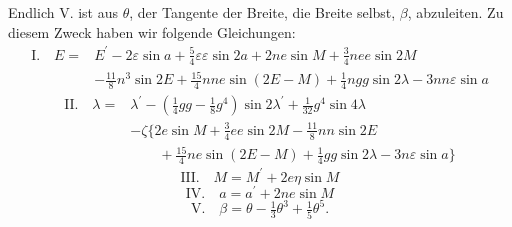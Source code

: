 \par\noindent\hspace*{\parindent}Endlich V. ist aus \(\theta\), der Tangente der Breite, die Breite selbst, \(\beta\),
abzuleiten. Zu diesem Zweck haben wir folgende Gleichungen:
\[
\begin{aligned}
\text{I.}\quad E={}&E^{\prime}-2\varepsilon\sin a+\tfrac54\varepsilon\varepsilon\sin2a
 +2ne\sin M+\tfrac34nee\sin2M\\
&-\tfrac{11}{8}n^3\sin2E+\tfrac{15}{4}nne\sin(2E-M)
 +\tfrac14ngg\sin2\lambda-3nn\varepsilon\sin a
\end{aligned}
\]
\[
\begin{aligned}
\text{II.}\quad\lambda={}&\lambda^{\prime}
 -\left(\tfrac14gg-\tfrac18g^4\right)\sin2\lambda^{\prime}
 +\tfrac{1}{32}g^4\sin4\lambda\\
&-\zeta\bigl\{2e\sin M+\tfrac34ee\sin2M-\tfrac{11}{8}nn\sin2E\\
&\qquad+\tfrac{15}{4}ne\sin(2E-M)+\tfrac14gg\sin2\lambda-3n\varepsilon\sin a\bigr\}
\end{aligned}
\]
\[
\text{III.}\quad M=M^{\prime}+2e\eta\sin M
\]
\[
\text{IV.}\quad a=a^{\prime}+2ne\sin M
\]
\[
\text{V.}\quad\beta=\theta-\tfrac13\theta^3+\tfrac15\theta^5.
\]
\clearpage
\endgroup
